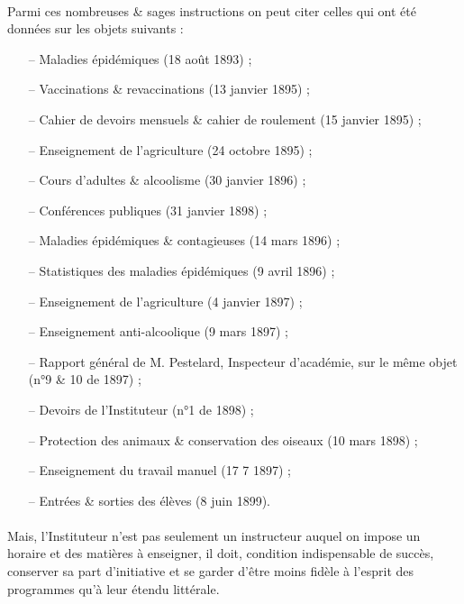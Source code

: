 \documentclass[../eBook.tex]{subfiles}
\begin{document}
      \paragraph{}Parmi ces nombreuses \& sages instructions on peut citer celles qui ont été données sur les objets suivants :
      \begin{itemize}[noitemsep]
        \setlength{\baselineskip}{16pt}
        \item[--] Maladies épidémiques (18 août 1893) ;
        \item[--] Vaccinations \& revaccinations (13 janvier 1895) ;
        \item[--] Cahier de devoirs mensuels \& cahier de roulement (15 janvier 1895) ;
        \item[--] Enseignement de l'agriculture (24 octobre 1895) ;
        \item[--] Cours d'adultes \& alcoolisme (30 janvier 1896) ;
        \item[--] Conférences publiques (31 janvier 1898) ;
        \item[--] Maladies épidémiques \& contagieuses (14 mars 1896) ;
        \item[--] Statistiques des maladies épidémiques (9 avril 1896) ;
        \item[--] Enseignement de l'agriculture (4 janvier 1897) ;
        \item[--] Enseignement anti-alcoolique (9 mars 1897) ;
        \item[--] Rapport général de M. Pestelard, Inspecteur d'académie, sur le même objet (n°9 \& 10 de 1897) ;
        \item[--] Devoirs de l'Instituteur (n°1 de 1898) ;
        \item[--] Protection des animaux \& conservation des oiseaux  (10 mars 1898) ;
        \item[--] Enseignement du travail manuel (17 7 1897) ;
        \item[--] Entrées \& sorties des élèves (8 juin 1899).
      \end{itemize}
      \paragraph{}Mais, l'Instituteur n'est pas seulement un instructeur auquel on impose un horaire et des matières à enseigner, il doit, condition indispensable de succès, conserver sa part d'initiative et se garder d'être moins fidèle à l'esprit des programmes qu'à leur étendu littérale.
\end{document}
